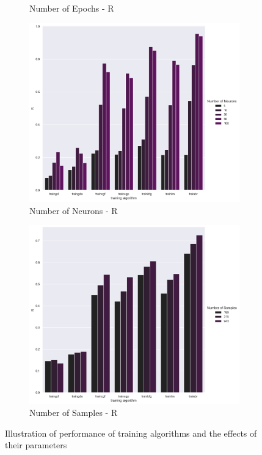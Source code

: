 \documentclass[11pt,conference,compsoc]{IEEEtran}
\begin{document}
\begin{figure}[]
\begin{subfigure}{0.33\linewidth}
        \caption{Number of Epochs - R}
    \end{subfigure}
    \begin{subfigure}{0.33\linewidth}
        \includegraphics[width=\linewidth]{images/Neurons-R.png}
        \caption{Number of Neurons - R}
    \end{subfigure}
    \begin{subfigure}{0.33\linewidth}
        \includegraphics[width=\linewidth]{images/Samples-R.png}
        \caption{Number of Samples - R}
    \end{subfigure}
    
    \caption{ Illustration of performance of training algorithms and the effects of their parameters}
    \label{fig:1}    
    
\end{figure}
\end{document}
